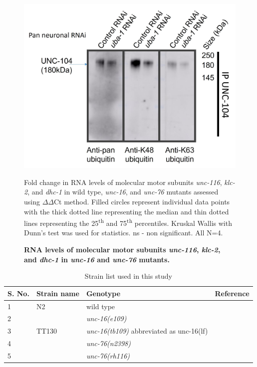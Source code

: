 \begin{appendices}
	\begin{figure}[H]
		\centering
		\includegraphics[width=0.8\linewidth]{figs/example}
		\caption[RNA levels of molecular motor subunits \textit{unc-116}, \textit{klc-2}, and \textit{dhc-1} in \textit{unc-16} and \textit{unc-76} mutants.]{\textbf{RNA levels of molecular motor subunits \textit{unc-116}, \textit{klc-2}, and \textit{dhc-1} in \textit{unc-16} and \textit{unc-76} mutants.}} \raggedright \small Fold change in RNA levels of molecular motor subunits \textit{unc-116}, \textit{klc-2}, and \textit{dhc-1} in wild type, \textit{unc-16}, and \textit{unc-76} mutants assessed using $\Delta \Delta$Ct method. Filled circles represent individual data points with the thick dotted line representing the median and thin dotted lines representing the 25\textsuperscript{th} and 75\textsuperscript{th} percentiles. Kruskal Wallis with Dunn's test was used for statistics. ns - non significant. All N=4.
		\label{fig:AnusheelaqPCR}
	\end{figure}
	
	
	\begin{table}[H]\centering
		\caption{Strain list used in this study}\label{tab:StrainlisB}
		\scriptsize
		\begin{tabularx}{1\textwidth}{@{} l l L l @{}}\toprule
			S. No. &Strain name &Genotype &Reference \\ &N2 &wild type &\cite{brenner1974} \\
			2 & &\textit{unc-16(e109)} &\cite{iwasaki1995} \\
			3 &TT130 &\textit{unc-16(tb109)} abbreviated as unc-16(lf) &\cite{choudhary2017} \\
			4 & &\textit{unc-76(n2398)} &\cite{bloom1997} \\
			5 & &\textit{unc-76(rh116)} &\cite{bloom1997} \\
			\bottomrule
		\end{tabularx}
	\end{table}
	

\end{appendices}
